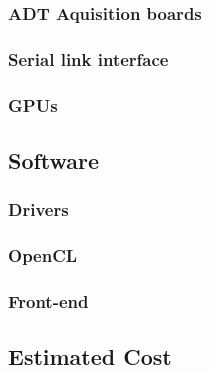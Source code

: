 		\subsubsection{ADT Aquisition boards}

		\subsubsection{Serial link interface}

		\subsubsection{GPUs}

	\subsection{Software}

		\subsubsection{Drivers}

		\subsubsection{OpenCL}

		\subsubsection{Front-end}

	\subsection{Estimated Cost}